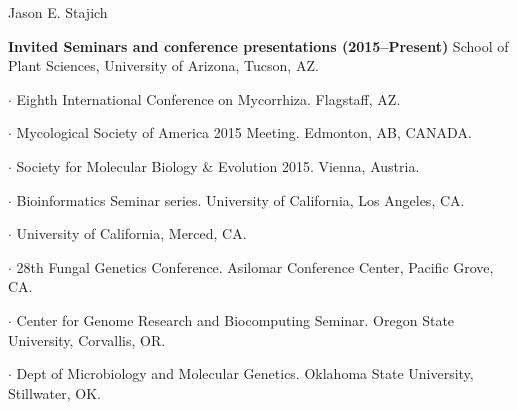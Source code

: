 \documentclass[10pt]{article}
\begin{document}
\begin{cv}{\centerline{Jason E. Stajich}}
\begin{cvlistcompact}{\bf Invited Seminars and conference presentations (2015--Present)}
  School of Plant Sciences, University of Arizona, Tucson,
    AZ. 
  \item $\cdot$ %
    Eighth International Conference on Mycorrhiza.
    Flagstaff, AZ. 
  \item $\cdot$ %
    Mycological Society of America 2015 Meeting. Edmonton, AB, CANADA. 
  \item $\cdot$  %
    Society for Molecular Biology \& Evolution 2015. Vienna, Austria.
  \item $\cdot$  %
    Bioinformatics Seminar series. University of California, Los
    Angeles, CA.
  \item $\cdot$  %
    University of California, Merced, CA. 
  \item $\cdot$   %
    28th Fungal Genetics Conference. Asilomar Conference Center,
    Pacific Grove, CA. 
  \item $\cdot$ %
    Center for Genome Research and Biocomputing Seminar. Oregon
    State University, Corvallis, OR.
  \item $\cdot$ %
    Dept of Microbiology and Molecular Genetics. Oklahoma State University, Stillwater, OK. \\    

\end{cvlistcompact}
\end{cv}
\end{document}
